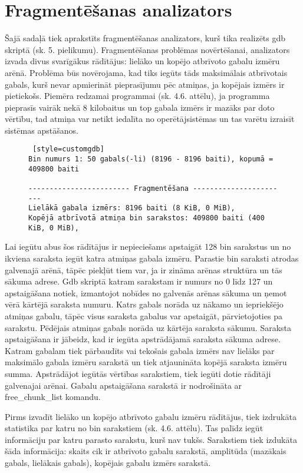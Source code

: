 \section{Fragmentēšanas analizators}
Šajā sadaļā tiek aprakstīts fragmentēšanas analizators, kurš tika realizēts gdb skriptā (sk. 5. pielikumu).
Fragmentēšanas problēmas novērtēšanai, analizators izvada divus svarīgākus rādītājus: lielāko un kopējo atbrīvoto gabalu izmēru arēnā.
Problēma būs novērojama, kad tiks iegūts tāds maksimālais atbrīvotais gabals, kurš nevar apmierināt pieprasījumu pēc atmiņas, ja kopējais izmērs ir pietiekošs.
Piemēra redzamai programmai (sk. 4.6. attēlu), ja programma pieprasīs vairāk nekā 8 kilobaitus un top gabala izmērs ir mazāks par doto vērtību, tad atmiņa var netikt iedalīta no operētājsistēmas un tas varētu izraisīt sistēmas apstāšanos.
\begin{figure}[h]
\begin{lstlisting} [style=customgdb]
Bin numurs 1: 50 gabals(-li) (8196 - 8196 baiti), kopumā = 409800 baiti

------------------------ Fragmentēšana -----------------------
Lielākā gabala izmērs: 8196 baiti (8 KiB, 0 MiB),
Kopējā atbrīvotā atmiņa bin sarakstos: 409800 baiti (400 KiB, 0 MiB),
\end{lstlisting}
\caption{\textbf{\fontsize{11}{12}\selectfont {Fragmentēšanas rādītāji}}}
\end{figure}

Lai iegūtu abus šos rādītājus ir nepieciešams apstaigāt 128 bin sarakstus un no ikviena saraksta iegūt katra atmiņas gabala izmēru.
Parastie bin saraksti atrodas galvenajā arēnā, tāpēc piekļūt tiem var, ja ir zināma arēnas struktūra un tās sākuma adrese.
Gdb skriptā katram sarakstam ir numurs no 0 līdz 127 un apstaigāšana notiek, izmantojot nobīdes no galvenās arēnas sākuma un ņemot vērā kārtējā saraksta numuru.
Katrs gabals norāda uz nākamo un iepriekšējo atmiņas gabalu, tāpēc visus saraksta gabalus var apstaigāt, pārvietojoties pa sarakstu.
Pēdējais atmiņas gabals norāda uz kārtēja saraksta sākumu.
Saraksta apstaigāšana ir jābeidz, kad ir iegūta apstrādājamā saraksta sākuma adrese.
Katram gabalam tiek pārbaudīts vai tekošais gabala izmērs nav lielāks par maksimālo gabala izmēru sarakstā un tiek atjaunināta kopējā saraksta izmēru summa.
Apstrādājot iegūtās vērtības sarakstiem, tiek iegūti dotie rādītāji galvenajai arēnai.
Gabalu apstaigāšana sarakstā ir nodrošināta ar free\_chunk\_list komandu.

Pirms izvadīt lielāko un kopējo atbrīvoto gabalu izmēru rādītājus, tiek izdrukāta statistika par katru no bin sarakstiem (sk. 4.6. attēlu).
Tas palīdz iegūt informāciju par katru parasto sarakstu, kurš nav tukšs.
Sarakstiem tiek izdukāta šāda informācija: skaits cik ir atbrīvoto gabalu sarakstā, amplitūda (mazākais gabals, lielākais gabals), kopējais gabalu izmērs sarakstā.



